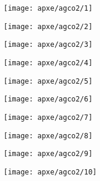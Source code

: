\begin{figure}[H]
\centering

\texttt{[image: apxe/agco2/1]}

\end{figure}

\begin{figure}[H]
\centering

\texttt{[image: apxe/agco2/2]}

\end{figure}

\begin{figure}[H]
\centering

\texttt{[image: apxe/agco2/3]}

\end{figure}

\begin{figure}[H]
\centering

\texttt{[image: apxe/agco2/4]}

\end{figure}

\begin{figure}[H]
\centering

\texttt{[image: apxe/agco2/5]}

\end{figure}

\begin{figure}[H]
\centering

\texttt{[image: apxe/agco2/6]}

\end{figure}

\begin{figure}[H]
\centering

\texttt{[image: apxe/agco2/7]}

\end{figure}

\begin{figure}[H]
\centering

\texttt{[image: apxe/agco2/8]}

\end{figure}

\begin{figure}[H]
\centering

\texttt{[image: apxe/agco2/9]}

\end{figure}

\begin{figure}[H]
\centering

\texttt{[image: apxe/agco2/10]}

\end{figure}


